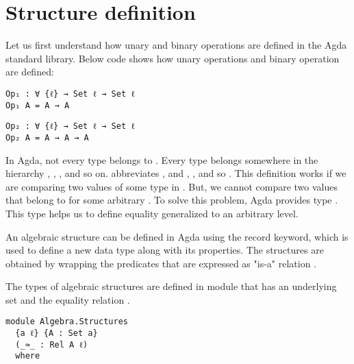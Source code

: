 \section{Structure definition}
Let us first understand how unary and binary operations are defined in the Agda
standard library. Below code shows how unary operations  and binary
operation  are defined:
\begin{verbatim}
Op₁ : ∀ {ℓ} → Set ℓ → Set ℓ
Op₁ A = A → A
\end{verbatim}
\begin{verbatim}
Op₂ : ∀ {ℓ} → Set ℓ → Set ℓ
Op₂ A = A → A → A
\end{verbatim}

In Agda, not every type belongs to . Every type belongs somewhere in
the hierarchy , , , and so on.
 abbreviates , and , , and so  \cite{plfa22.08}. This definition works if we are comparing two
values of some type in . But, we cannot compare two values that
belong to  for some arbitrary . To solve this problem,
Agda provides type . This type helps us to define equality
generalized to an arbitrary level.

An algebraic structure can be defined in Agda using the record keyword, which is
used to define a new data type along with its properties. The structures are
obtained by wrapping the predicates that are expressed as "is-a" relation
\cite{hu2021formalizing}.

The types of algebraic structures are defined in module
 that has an underlying set  and the
equality relation .
\begin{verbatim}
module Algebra.Structures
  {a ℓ} {A : Set a} 
  (_≈_ : Rel A ℓ)    
  where
\end{verbatim}

